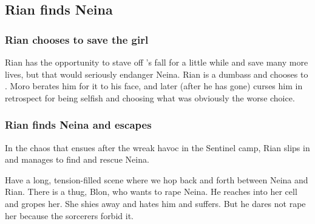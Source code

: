








\subsection{Rian finds Neina}





\subsubsection{Rian chooses to save the girl}
Rian has the opportunity to stave off \Malcur's fall for a little while and save many more lives, but that would seriously endanger Neina. 
Rian is a dumbass and chooses to . 
Moro berates him for it to his face, and later (after he has gone) curses him in retrospect for being selfish and choosing what was obviously the worse choice.




\subsubsection{Rian finds Neina and escapes}
In the chaos that ensues after the \banes wreak havoc in the Sentinel camp, Rian slips in and manages to find and rescue Neina.

Have a long, tension-filled scene where we hop back and forth between Neina and Rian. 
There is a thug, Blon, who wants to rape Neina.
He reaches into her cell and gropes her. 
She shies away and hates him and suffers. 
But he dares not rape her because the sorcerers forbid it. 

